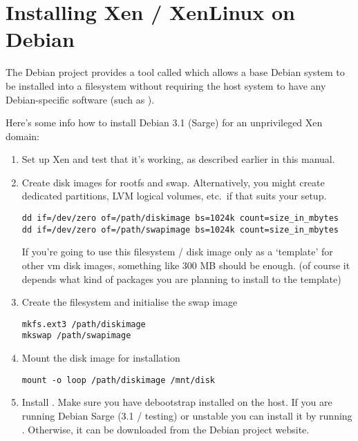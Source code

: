 \chapter{Installing Xen / XenLinux on Debian}

The Debian project provides a tool called  which
allows a base Debian system to be installed into a filesystem without
requiring the host system to have any Debian-specific software (such
as ).

Here's some info how to install Debian 3.1 (Sarge) for an unprivileged
Xen domain:

\begin{enumerate}

\item Set up Xen and test that it's working, as described earlier in
  this manual.

\item Create disk images for rootfs and swap. Alternatively, you might
  create dedicated partitions, LVM logical volumes, etc.\ if that
  suits your setup.
\begin{verbatim}
dd if=/dev/zero of=/path/diskimage bs=1024k count=size_in_mbytes
dd if=/dev/zero of=/path/swapimage bs=1024k count=size_in_mbytes
\end{verbatim}

  If you're going to use this filesystem / disk image only as a
  `template' for other vm disk images, something like 300 MB should be
  enough. (of course it depends what kind of packages you are planning
  to install to the template)

\item Create the filesystem and initialise the swap image
\begin{verbatim}
mkfs.ext3 /path/diskimage
mkswap /path/swapimage
\end{verbatim}

\item Mount the disk image for installation
\begin{verbatim}
mount -o loop /path/diskimage /mnt/disk
\end{verbatim}

\item Install . Make sure you have debootstrap
  installed on the host.  If you are running Debian Sarge (3.1 /
  testing) or unstable you can install it by running .  Otherwise, it can be downloaded from the
  Debian project website.


\end{enumerate}
